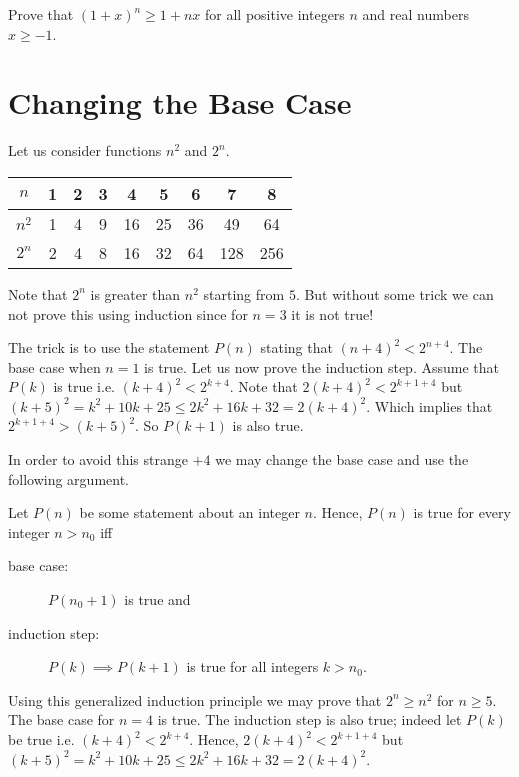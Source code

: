 \begin{exercise}
  Prove that $(1 + x)^n \ge 1 + nx$ for all positive integers $n$ and real
  numbers $x \ge -1$.
\end{exercise}

\section{Changing the Base Case}
Let us consider functions $n^2$ and $2^n$.

\begin{center}
  \begin{tabular}{c | c | c | c | c | c | c | c | c}
    $n$   & 1 & 2 & 3 & 4  & 5  & 6  & 7   & 8   \\
    \hline
    $n^2$ & 1 & 4 & 9 & 16 & 25 & 36 & 49  & 64  \\
    $2^n$ & 2 & 4 & 8 & 16 & 32 & 64 & 128 & 256
  \end{tabular}
\end{center}
Note that $2^n$ is greater than $n^2$ starting from $5$. But without some trick
we can not prove this using induction since for $n = 3$ it is not true!

The trick is to use the statement $P(n)$ stating that $(n + 4)^2 < 2^{n + 4}$.
The base case when $n = 1$ is true.
Let us now prove the induction step. Assume that $P(k)$ is true i.e.
$(k + 4)^2 < 2^{k + 4}$. Note that $2(k + 4)^2 < 2^{k + 1 + 4}$ but
$(k + 5)^2 = k^2 + 10k + 25 \le 2k^2 + 16k + 32 = 2(k + 4)^2$.
Which implies that
$2^{k + 1 + 4} > (k + 5)^2$. So $P(k + 1)$ is also true.

In order to avoid this strange $+4$ we may change the base
case and use the following argument.

\begin{theorem}
\label{theorem:induction-shifted-base}
  Let $P(n)$ be some statement about an integer $n$.
  Hence, $P(n)$ is true for every integer $n > n_0$ iff
  \begin{description}
    \item[base case:] $P(n_0 + 1)$ is true and
    \item[induction step:] $P(k) \implies P(k + 1)$ is true for all
      integers $k > n_0$.
  \end{description}
\end{theorem}

Using this generalized induction principle we may prove that $2^n \ge n^2$ for
$n \ge 5$. The base case for $n = 4$ is true. The induction step is also true;
indeed let $P(k)$ be true i.e. $(k + 4)^2 < 2^{k + 4}$. Hence,
$2(k + 4)^2 < 2^{k + 1 + 4}$ but
$(k + 5)^2 = k^2 + 10k + 25 \le 2k^2 + 16k + 32 = 2(k + 4)^2$.

